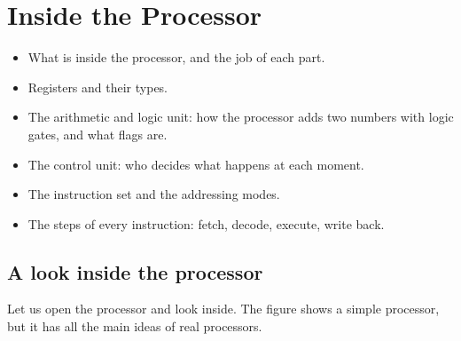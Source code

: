 \chapter{Inside the Processor}

\begin{khulasa}
\begin{itemize}
    \item What is inside the processor, and the job of each part.
    \item Registers and their types.
    \item The arithmetic and logic unit: how the processor adds two numbers with logic gates, and what flags are.
    \item The control unit: who decides what happens at each moment.
    \item The instruction set and the addressing modes.
    \item The steps of every instruction: fetch, decode, execute, write back.
\end{itemize}
\end{khulasa}

\section{A look inside the processor}

Let us open the processor and look inside. The figure shows a simple processor, but it has all the main
ideas of real processors.

